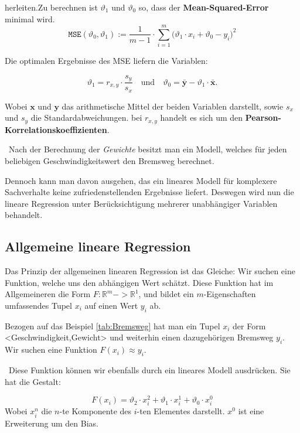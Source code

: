 herleiten.Zu berechnen ist $\vartheta_1$ und $\vartheta_0$ so, dass der \textbf{Mean-Squared-Error} minimal wird. 
\begin{equation}
\label{eq:mse}
\mathtt{MSE}(\vartheta_0, \vartheta_1) := \frac{1}{m-1} \cdot \sum\limits_{i=1}^m \bigl(\vartheta_1 \cdot x_i + \vartheta_0 - y_i\bigr)^2
\end{equation}

Die optimalen Ergebnisse des MSE liefern die Variablen:

\begin{equation}
\label{eq:theta0}
\vartheta_1 = r_{x,y} \cdot \frac{s_y}{s_x} \quad \mbox{und} \quad \vartheta_0 = \bar{\mathbf{y}} - \vartheta_1 \cdot \bar{\mathbf{x}}.
\end{equation}

Wobei $\mathbf{x}$ und $\mathbf{y}$ das arithmetische Mittel der beiden Variablen darstellt, sowie $s_x$ und $s_y$ die Standardabweichungen. bei $r_{x,y}$ handelt es sich um den \textbf{Pearson-Korrelationskoeffizienten}. 

~\newline Nach der Berechnung der \textit{Gewichte} besitzt man ein Modell, welches für jeden beliebigen Geschwindigkeitswert den Bremsweg berechnet. 

Dennoch kann man davon ausgehen, das ein lineares Modell für komplexere Sachverhalte keine zufriedenstellenden Ergebnisse liefert. Deswegen wird nun die lineare Regression unter Berücksichtigung mehrerer unabhängiger Variablen behandelt. 
\subsection{Allgemeine lineare Regression}
Das Prinzip der allgemeinen linearen Regression ist das Gleiche: Wir suchen eine Funktion, welche uns den abhängigen Wert schätzt. Diese Funktion hat im Allgemeineren die Form  $F:\mathbb{R}^m -> \mathbb{R}^1$, und bildet ein $m$-Eigenschaften umfassendes Tupel $x_i$ auf einen Wert $y_i$ ab. 

Bezogen auf das Beispiel \ref{tab:Bremsweg} hat man ein Tupel $x_i$ der Form <Geschwindigkeit,Gewicht> und weiterhin einen dazugehörigen Bremsweg $y_i$. Wir suchen eine Funktion $F(x_i) \approx y_i$. 

~\newline Diese Funktion können wir ebenfalls durch ein lineares Modell ausdrücken. Sie hat die Gestalt: 

\begin{equation}
	F(x_i)= \vartheta_2 \cdot x^2_i + \vartheta_1 \cdot x^1_i + \vartheta_0 \cdot x^0_i
\end{equation}
Wobei $x^n_i$ die $n$-te Komponente des $i$-ten Elementes darstellt. $x^0$ ist eine Erweiterung um den Bias.


